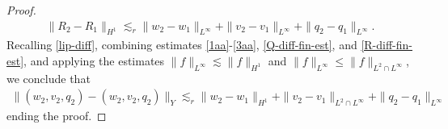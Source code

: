 \documentclass[12pt,reqno]{amsart}
\numberwithin{equation}{section}  %
\numberwithin{figure}{section}
\begin{document}
\begin{proof}
\begin{equation}
\begin{split}
  \| R_{2} - R_{1} \|_{H^{1}} \lesssim_{r} \| w_{2} - w_{1} \|_{L^{\infty}} + \| v_{2} - v_{1} \|_{L^{\infty}}
+ \| q_{2} - q_{1} \|_{L^{\infty}}.
\end{split}
\end{equation}
%
%
Recalling \eqref{lip-diff}, combining estimates \eqref{1aa}-\eqref{3aa},
\eqref{Q-diff-fin-est}, and \eqref{R-diff-fin-est}, and applying the estimates
$\| f \|_{L^{\infty}} \lesssim \| f \|_{H^{1}}$ and $\| f \|_{L^{\infty}} \le \| f
\|_{L^{2} \cap L^{\infty}}$, we conclude that
%
%
%
\begin{equation*}
\begin{split}
  \|(w_{2}, v_{2}, q_{2}) - (w_{2}, v_{2}, q_{2})\|_{Y} \lesssim_{r} \| w_{2} - w_{1} \|_{H^{1}} + \| v_{2} - v_{1} \|_{L^{2} \cap L^{\infty}}  + \| q_{2} - q_{1} \|_{L^{\infty}}
\end{split}
\end{equation*}
%
%
ending the proof.
%
\end{proof} 
%
\end{document}
